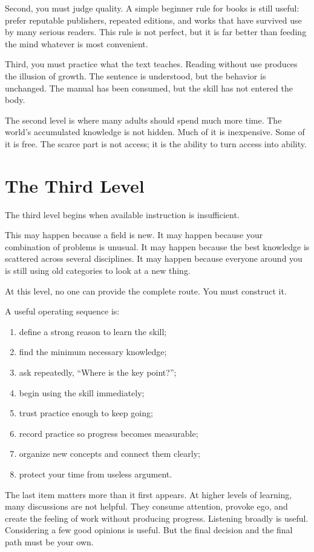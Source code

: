 Second, you must judge quality. A simple beginner rule for books is still useful: prefer reputable publishers, repeated editions, and works that have survived use by many serious readers. This rule is not perfect, but it is far better than feeding the mind whatever is most convenient.

Third, you must practice what the text teaches. Reading without use produces the illusion of growth. The sentence is understood, but the behavior is unchanged. The manual has been consumed, but the skill has not entered the body.

The second level is where many adults should spend much more time. The world's accumulated knowledge is not hidden. Much of it is inexpensive. Some of it is free. The scarce part is not access; it is the ability to turn access into ability.

\section*{The Third Level}

The third level begins when available instruction is insufficient.

This may happen because a field is new. It may happen because your combination of problems is unusual. It may happen because the best knowledge is scattered across several disciplines. It may happen because everyone around you is still using old categories to look at a new thing.

At this level, no one can provide the complete route. You must construct it.

A useful operating sequence is:

\begin{enumerate}
\item define a strong reason to learn the skill;
\item find the minimum necessary knowledge;
\item ask repeatedly, ``Where is the key point?'';
\item begin using the skill immediately;
\item trust practice enough to keep going;
\item record practice so progress becomes measurable;
\item organize new concepts and connect them clearly;
\item protect your time from useless argument.
\end{enumerate}

The last item matters more than it first appears. At higher levels of learning, many discussions are not helpful. They consume attention, provoke ego, and create the feeling of work without producing progress. Listening broadly is useful. Considering a few good opinions is useful. But the final decision and the final path must be your own.

